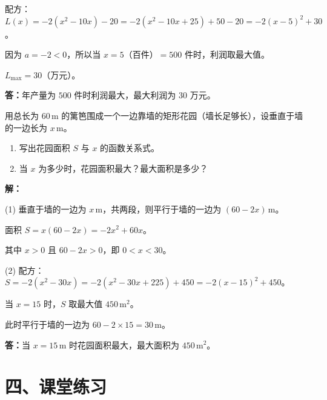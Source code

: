 \documentclass[12pt, a4paper]{ctexart}
\begin{document}
配方：$L(x) = -2(x^2-10x) - 20 = -2(x^2-10x+25) + 50 - 20 = -2(x-5)^2 + 30$。

因为 $a=-2<0$，所以当 $x=5$（百件）$=500$ 件时，利润取最大值。

$L_{\max} = 30$（万元）。

\textbf{答：}年产量为 $\boxed{500}$ 件时利润最大，最大利润为 $\boxed{30}$ 万元。

\begin{appbox}[【应用3】面积最值]
用总长为 $60$\,m 的篱笆围成一个一边靠墙的矩形花园（墙长足够长），设垂直于墙的一边长为 $x$\,m。
\begin{enumerate}[leftmargin=*]
  \item 写出花园面积 $S$ 与 $x$ 的函数关系式。
  \item 当 $x$ 为多少时，花园面积最大？最大面积是多少？
\end{enumerate}
\end{appbox}

\textbf{解：}

(1) 垂直于墙的一边为 $x$\,m，共两段，则平行于墙的一边为 $(60-2x)$\,m。

面积 $S = x(60-2x) = -2x^2 + 60x$。

其中 $x > 0$ 且 $60-2x > 0$，即 $0 < x < 30$。

(2) 配方：$S = -2(x^2-30x) = -2(x^2-30x+225) + 450 = -2(x-15)^2 + 450$。

当 $x=15$ 时，$S$ 取最大值 $450$\,m$^2$。

此时平行于墙的一边为 $60-2\times15 = 30$\,m。

\textbf{答：}当 $x=\boxed{15}$\,m 时花园面积最大，最大面积为 $\boxed{450}$\,m$^2$。

\section*{\textcolor{tipgreen}{四、课堂练习}}
\end{document}
